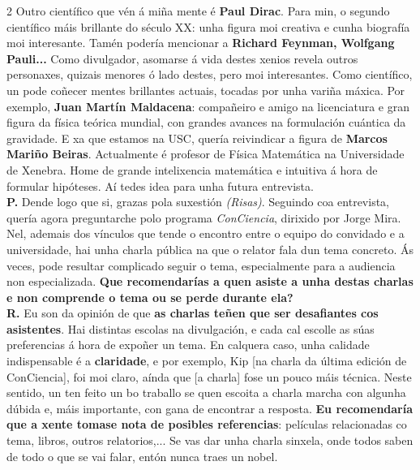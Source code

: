 \begin{refsection}
\begin{multicols}{2}
Outro científico que vén á miña mente é \textbf{Paul Dirac}. Para min, o segundo científico máis brillante do século XX: unha figura moi creativa e cunha biografía moi interesante. Tamén podería mencionar a \textbf{Richard Feynman, Wolfgang Pauli...} Como divulgador, asomarse á vida destes xenios revela outros personaxes, quizais menores ó lado destes, pero moi interesantes. Como científico, un pode coñecer mentes brillantes actuais, tocadas por unha variña máxica. Por exemplo, \textbf{Juan Martín Maldacena}: compañeiro e amigo na licenciatura e gran figura da física teórica mundial, con grandes avances na formulación cuántica da gravidade. E xa que estamos na USC, quería reivindicar a figura de \textbf{Marcos Mariño Beiras}. Actualmente é profesor de Física Matemática na Universidade de Xenebra. Home de grande intelixencia matemática e intuitiva á hora de formular hipóteses. Aí tedes idea para unha futura entrevista.\\

\noindent \textbf{P.} \hspace{5px} Dende logo que si, grazas pola suxestión \emph{(Risas)}. Seguindo coa entrevista, quería agora preguntarche polo programa \emph{ConCiencia}, dirixido por Jorge Mira. Nel, ademais dos vínculos que tende o encontro entre o equipo do convidado e a universidade, hai unha charla pública na que o relator fala dun tema concreto. Ás veces, pode resultar complicado seguir o tema, especialmente para a audiencia non especializada. \textbf{Que recomendarías a quen asiste a unha destas charlas e non comprende o tema ou se perde durante ela?} \\

\noindent \textbf{R.} \hspace{5px} Eu son da opinión de que \textbf{as charlas teñen que ser desafiantes cos asistentes}. Hai distintas escolas na divulgación, e cada cal escolle as súas preferencias á hora de expoñer un tema. En calquera caso, unha calidade indispensable é a \textbf{claridade}, e por exemplo, Kip [na charla da última edición de ConCiencia], foi moi claro, aínda que [a charla] fose un pouco máis técnica. Neste sentido, un ten feito un bo traballo se quen escoita a charla marcha con algunha dúbida e, máis importante, con gana de encontrar a resposta. \textbf{Eu recomendaría que a xente tomase nota de posibles referencias}: películas relacionadas co tema, libros, outros relatorios,... Se vas dar unha charla sinxela, onde todos saben de todo o que se vai falar, entón nunca traes un nobel.\\


\end{multicols}
\end{refsection}
